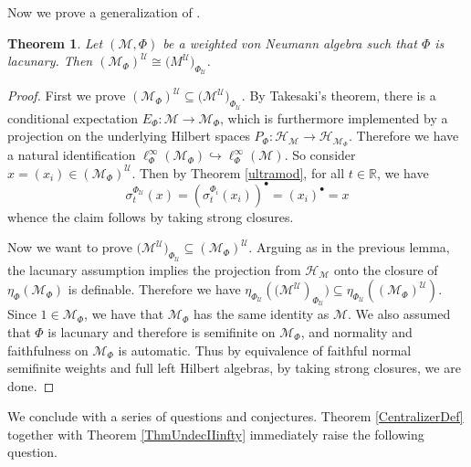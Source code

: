 \documentclass[12pt]{amsart}
\newtheorem{thm}{Theorem}[section]
\theoremstyle{definition}
\def\cal{\mathcal}
\newcommand\cU{{\cal U}}
\def \bbR{\mathbb{R}}
\begin{document}
Now we prove a generalization of \cite[Proposition 5.3]{AGH}.

\begin{thm}
    Let $(\cal M, \Phi)$ be a weighted von Neumann algebra such that $\Phi$ is lacunary.  Then $(\cal M_{\Phi})^{\cU} \cong  \cal (M^{\cU})_{\Phi_{\cU}}$.
\end{thm}

\begin{proof}
    First we prove $(\cal M_{\Phi})^{\cU} \subseteq \cal (\cal M^{\cU})_{\Phi_{\cU}}$.  By Takesaki's theorem, there is a conditional expectation $E_{\Phi} : \cal M \to \cal M_{\Phi}$, which is furthermore implemented by a projection on the underlying Hilbert spaces $P_{\Phi} : \cal H_{\cal M} \to \cal H_{\cal M_{\Phi}}$.  Therefore we have a natural identification $\ell^{\infty}_{\Phi}(\cal M_{\Phi}) \hookrightarrow \ell^{\infty}_{\Phi}(\cal M)$.  So consider $x = (x_i) \in (\cal M_{\Phi})^{\cU}$.  Then by Theorem \ref{ultramod}, for all $t \in \bbR$, we have
    \[
    \sigma_t^{\Phi_\cU}(x) = (\sigma_t^{\Phi_i}(x_i))^\bullet = (x_i)^\bullet = x
    \]
    whence the claim follows by taking strong closures.

    Now we want to prove $\cal (\cal M^{\cU})_{\Phi_{\cU}} \subseteq (\cal M_{\Phi})^{\cU}$.  Arguing as in the previous lemma, the lacunary assumption implies the projection from $\cal H_{\cal M}$ onto the closure of $\eta_{\Phi}(\cal M_{\Phi})$ is definable.  Therefore we have $\eta_{\Phi_{\cU}}(\cal (\cal M^{\cU})_{\Phi_{\cU}}) \subseteq \eta_{\Phi_{\cU}}((\cal M_{\Phi})^{\cU})$.  Since $1 \in \cal M_{\Phi}$, we have that $\cal M_{\Phi}$ has the same identity as $\cal M$.  We also assumed that $\Phi$ is lacunary and therefore is semifinite on $\cal M_{\Phi}$, and normality and faithfulness on $\cal M_{\Phi}$ is automatic.  Thus by equivalence of faithful normal semifinite weights and full left Hilbert algebras, by taking strong closures, we are done.
\end{proof}




We conclude with a series of questions and conjectures.  Theorem \ref{CentralizerDef} together with Theorem \ref{ThmUndecIIinfty} immediately raise the following question.
\end{document}
